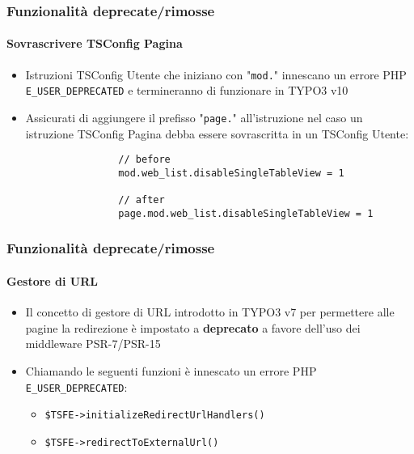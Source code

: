 
\begin{frame}[fragile]
	\frametitle{Funzionalità deprecate/rimosse}
	\framesubtitle{Sovrascrivere TSConfig Pagina}

	\lstset{basicstyle=\smaller\ttfamily}

	\begin{itemize}
		\item Istruzioni TSConfig Utente che iniziano con "\texttt{mod.}" innescano un errore PHP
			\texttt{E\_USER\_DEPRECATED} e termineranno di funzionare in TYPO3 v10
		\item Assicurati di aggiungere il prefisso "\texttt{page.}" all'istruzione
			nel caso un istruzione TSConfig Pagina debba essere sovrascritta in un TSConfig Utente:

			\begin{lstlisting}
				// before
				mod.web_list.disableSingleTableView = 1

				// after
				page.mod.web_list.disableSingleTableView = 1
			\end{lstlisting}

	\end{itemize}

\end{frame}


\begin{frame}[fragile]
	\frametitle{Funzionalità deprecate/rimosse}
	\framesubtitle{Gestore di URL}

	\begin{itemize}
		\item Il concetto di gestore di URL introdotto in TYPO3 v7 per permettere alle pagine
			la redirezione è impostato a \textbf{deprecato} a favore dell'uso dei middleware
			PSR-7/PSR-15 

		\item Chiamando le seguenti funzioni è innescato un errore PHP
			\texttt{E\_USER\_DEPRECATED}:

			\begin{itemize}
				\item \texttt{\$TSFE->initializeRedirectUrlHandlers()}
				\item \texttt{\$TSFE->redirectToExternalUrl()}
			\end{itemize}

	\end{itemize}

\end{frame}

